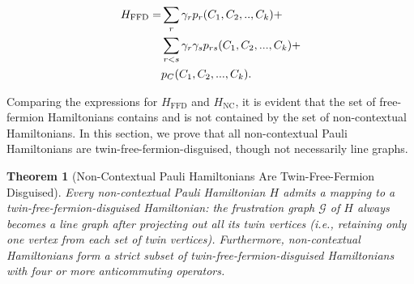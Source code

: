 \documentclass[%
 aip,
 amsmath,amssymb,
 reprint,%
]{revtex4-1}
\newtheorem{theorem}{Theorem}
\newcommand{\noncontextualHamiltonian}{H_{\mathrm{NC}}}
\newcommand{\freeFermionHamiltonian}{H_{\mathrm{FFD}}}
\begin{document}
\begin{align}
    \freeFermionHamiltonian = &\sum_r \gamma_r p_r (C_1, C_2, .., C_{k}) + \notag\\
    & \sum_{r<s}\gamma_r \gamma_s p_{rs}(C_1, C_2, ..., C_k) + \notag\\
    &p_C(C_1, C_2, ..., C_{k}).
    \label{eq:twin-vertex-disguised-hamiltonian}
\end{align}

Comparing the expressions for $\freeFermionHamiltonian$ and $\noncontextualHamiltonian$, it is evident that the set of free-fermion Hamiltonians contains and is not contained by the set of non-contextual Hamiltonians. In this section, we prove that all non-contextual Pauli Hamiltonians are twin-free-fermion-disguised, though not necessarily line graphs. 

\begin{theorem}[Non-Contextual Pauli Hamiltonians Are Twin-Free-Fermion Disguised]\label{thm:NCareFFS}
    Every non-contextual Pauli Hamiltonian $H$ admits a mapping to a twin-free-fermion-disguised Hamiltonian: the frustration graph $\mathcal{G}$ of $H$ always becomes a line graph after projecting out all its twin vertices (i.e., retaining only one vertex from each set of twin vertices). Furthermore, non-contextual Hamiltonians form a strict subset of twin-free-fermion-disguised Hamiltonians with four or more anticommuting operators.
\end{theorem}
\end{document}
